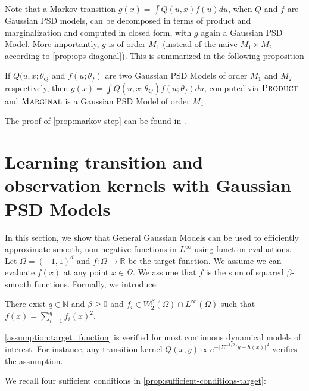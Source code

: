 Note that a Markov transition $g(x) = \int Q(u, x)f(u)du$, when $Q$ and $f$ are Gaussian PSD models, can be decomposed in terms of product and marginalization and computed in closed form, with $g$ again a Gaussian PSD Model. More importantly,  $g$ is of order $M_1$ (instead of the naive $M_1\times M_2$ according to \cref{prop:ops-diagonal}). This is summarized in the following proposition

\begin{proposition}\label{prop:markov-step}
   If $Q(u, x; \theta_Q$ and $f(u; \theta_f)$ are two Gaussian PSD Models of order $M_1$ and $M_2$ respectively, then $g(x) = \int Q(u, x;\theta_Q)f(u;\theta_f)du$, computed via $\operatorname{\textsc{Product}}$ and $\operatorname{\textsc{Marginal}}$ is a Gaussian PSD Model of order $M_1$.
\end{proposition}
The proof of \cref{prop:markov-step} can be found in \citep[Appendix F.5]{ciliberto2021}.

\section{Learning transition and observation kernels with Gaussian PSD Models}\label{sec:learning-gaussian-psd}
In this section, we show that General Gaussian Models can be used to efficiently approximate smooth, non-negative functions in $L^\infty$ using function evaluations. Let $\Omega = (-1, 1)^d$ and $f: \Omega \to \mathbb R$ be the target function. We assume we can evaluate $f(x)$ at any point $x\in\Omega$. We assume that $f$ is the sum of squared $\beta$-smooth functions. Formally, we introduce:

\begin{assumption}\label{assumption:target_function}
    There exist $q \in\mathbb N$ and $\beta \geq 0$ and $f_i \in W^\beta_2(\Omega) \cap L^\infty(\Omega)$ such that $f(x) = \sum_{i=1}^q f_i(x)^2$.
\end{assumption}

\cref{assumption:target_function} is verified for most continuous dynamical models of interest. For instance, any transition kernel $Q(x, y) \propto e^{-\Vert \Sigma^{-1/2}(y - h(x)\Vert^2}$ verifies the assumption.

We recall four sufficient conditions in \cref{prop:sufficient-conditions-target}:

